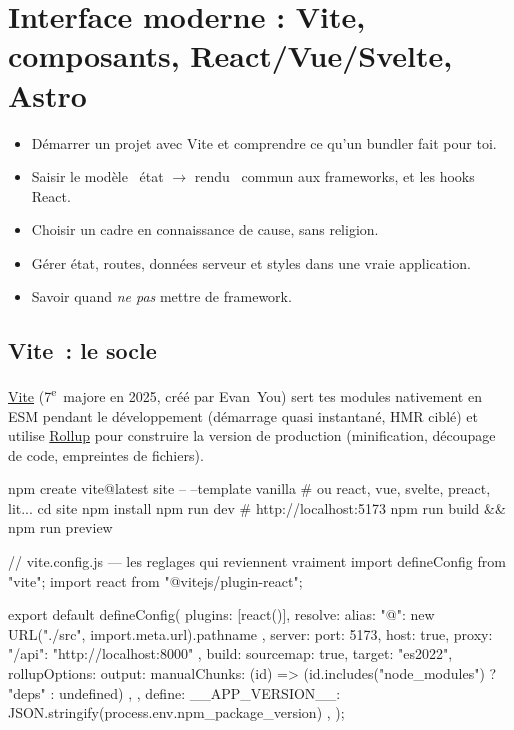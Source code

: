 \documentclass[12pt,a4paper,twoside,openright]{book}
\newcommand{\link}[2]{\href{#2}{#1}}
\begin{document}
\chapter{Interface moderne : Vite, composants, React/Vue/Svelte, Astro}
\label{ch-js-frameworks}

\begin{objectif}
\begin{itemize}
  \item D\'emarrer un projet avec Vite et comprendre ce qu'un bundler fait pour toi.
  \item Saisir le mod\`ele \og ~\'etat $\rightarrow$ rendu~ \fg{} commun aux frameworks, et les hooks React.
  \item Choisir un cadre en connaissance de cause, sans religion.
  \item G\'erer \'etat, routes, donn\'ees serveur et styles dans une vraie application.
  \item Savoir quand \emph{ne pas} mettre de framework.
\end{itemize}
\end{objectif}

\section{Vite~: le socle}

\link{Vite}{https://vitejs.dev/} (7\textsuperscript{e}~majore en 2025, cr\'e\'e par Evan~You) sert tes
modules nativement en ESM pendant le d\'eveloppement (d\'emarrage quasi instantan\'e, HMR cibl\'e) et
utilise \link{Rollup}{https://rollupjs.org/} pour construire la version de production
(minification, d\'ecoupage de code, empreintes de fichiers).

\begin{terminal}
npm create vite@latest site -- --template vanilla        # ou react, vue, svelte, preact, lit...
cd site
npm install
npm run dev              # http://localhost:5173
npm run build && npm run preview
\end{terminal}

\begin{codejs}
// vite.config.js --- les reglages qui reviennent vraiment
import { defineConfig } from "vite";
import react from "@vitejs/plugin-react";

export default defineConfig({
  plugins: [react()],
  resolve: { alias: { "@": new URL("./src", import.meta.url).pathname } },
  server: { port: 5173, host: true, proxy: { "/api": "http://localhost:8000" } },
  build: {
    sourcemap: true,
    target: "es2022",
    rollupOptions: { output: { manualChunks: (id) => (id.includes("node_modules") ? "deps" : undefined) } },
  },
  define: { __APP_VERSION__: JSON.stringify(process.env.npm_package_version) },
});
\end{codejs}
\end{document}
